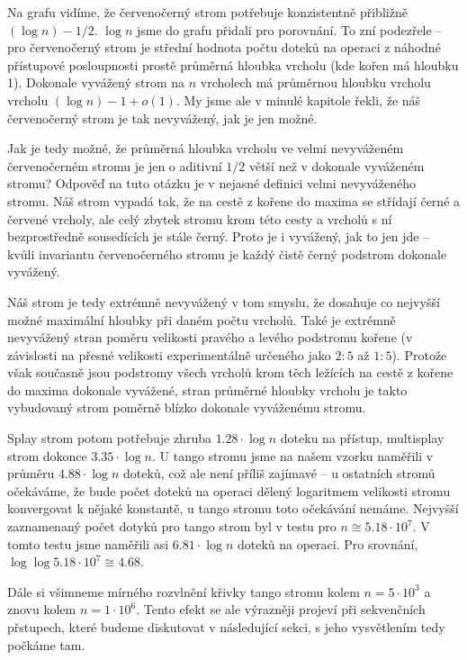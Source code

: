 Na grafu vidíme, že červenočerný strom potřebuje konzistentně přibližně $(\log
n) - 1/2$. $\log n$ jsme do grafu přidali pro porovnání. To zní podezřele --
pro červenočerný strom je střední hodnota počtu doteků na operaci z náhodné
přístupové posloupnosti prostě průměrná hloubka vrcholu (kde kořen má hloubku
1). Dokonale vyvážený strom na $n$ vrcholech má průměrnou hloubku vrcholu
vrcholu $(\log n) - 1 + o(1)$. My jsme ale v minulé kapitole řekli, že náš
červenočerný strom je tak nevyvážený, jak je jen možné.

Jak je tedy možné, že průměrná hloubka vrcholu ve velmi nevyváženém
červenočerném stromu je jen o aditivní $1/2$ větší než v dokonale vyváženém
stromu? Odpověď na tuto otázku je v nejasné definici velmi nevyváženého stromu.
Náš strom vypadá tak, že na cestě z kořene do maxima se střídají černé a červené
vrcholy, ale celý zbytek stromu krom této cesty a vrcholů s ní bezprostředně
sousedících je stále černý. Proto je i vyvážený, jak to jen jde -- kvůli
invariantu červenočerného stromu je každý čistě černý podstrom dokonale
vyvážený.

Náš strom je
tedy extrémně nevyvážený v tom smyslu, že dosahuje co nejvyšší možné maximální
hloubky při daném počtu vrcholů. Také je extrémně nevyvážený stran poměru
velikosti pravého a levého podstromu kořene (v závislosti na přesné velikosti
experimentálně určeného jako $2:5$ až $1:5$). Protože však současně jsou
podstromy všech vrcholů krom těch ležících na cestě z kořene do maxima dokonale
vyvážené, stran průměrné hloubky vrcholu je takto vybudovaný strom poměrně
blízko dokonale vyváženému stromu.


Splay strom potom potřebuje zhruba $1.28\cdot \log n$ doteku na přístup, multisplay strom
dokonce $3.35\cdot \log n$. U tango stromu jsme na našem vzorku naměřili v
průměru $4.88\cdot \log n$ doteků, což ale není příliš zajímavé -- u ostatních
stromů očekáváme, že bude počet doteků na operaci dělený logaritmem velikosti stromu konvergovat
k nějaké konstantě, u tango stromu toto očekávání nemáme. Nejvyšší zaznamenaný
počet dotyků pro tango strom byl v testu pro $n \cong 5.18\cdot 10^7$. V tomto
testu jsme naměřili asi $6.81\cdot \log n$ doteků na operaci. Pro srovnání,
$\log\log 5.18\cdot 10^7 \cong 4.68$. 

Dále si všimneme mírného rozvlnění křivky tango stromu kolem $n=5\cdot 10^3$ a
znovu kolem $n=1\cdot 10^6$. Tento efekt se ale výrazněji projeví při
sekvenčních přstupech, které budeme diskutovat v následující sekci, s jeho
vysvětlením tedy počkáme tam.

